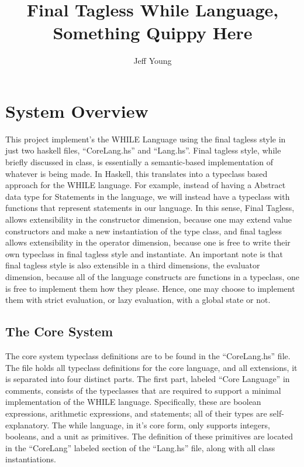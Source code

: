 \documentclass[9pt,letterpaper]{extarticle}
\title{Final Tagless While Language, Something Quippy Here}
\author{Jeff Young}
\date{}
\begin{document}
	\maketitle
  \section{System Overview}
  This project implement's the WHILE Language using the final tagless style in
  just two haskell files, ``CoreLang.hs'' and ``Lang.hs''. Final tagless style,
  while briefly discussed in class, is essentially a semantic-based
  implementation of whatever is being made. In Haskell, this translates into a
  typeclass based approach for the WHILE language. For example, instead of
  having a Abstract data type for Statements in the language, we will instead
  have a typeclass with functions that represent statements in our language. In
  this sense, Final Tagless, allows extensibility in the constructor dimension,
  because one may extend value constructors and make a new instantiation of the
  type class, and final tagless allows extensibility in the operator dimension,
  because one is free to write their own typeclass in final tagless style and
  instantiate. An important note is that final tagless style is also extensible
  in a third dimensions, the evaluator dimension, because all of the language
  constructs are functions in a typeclass, one is free to implement them how
  they please. Hence, one may choose to implement them with strict evaluation,
  or lazy evaluation, with a global state or not.

  \subsection{The Core System}
  The core system typeclass definitions are to be found in the ``CoreLang.hs''
  file. The file holds all typeclass definitions for the core language, and all
  extensions, it is separated into four distinct parts. The first part, labeled
  ``Core Language'' in comments, consists of the typeclasses that are required
  to support a minimal implementation of the WHILE language. Specifically, these
  are boolean expressions, arithmetic expressions, and statements; all of their
  types are self-explanatory. The while language, in it's core form, only
  supports integers, booleans, and a unit as primitives. The definition of these
  primitives are located in the ``CoreLang'' labeled section of the ``Lang.hs''
  file, along with all class instantiations.
\end{document}
